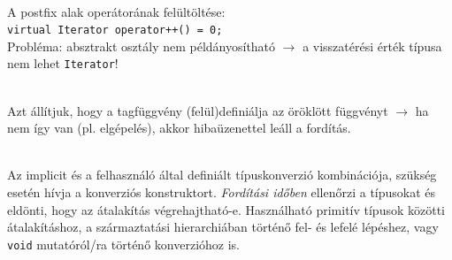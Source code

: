 \documentclass[usenames,dvipsnames,aspectratio=169]{beamer}
\begin{document}
\begin{frame}
    \begin{exampleblock}{}
        
    \end{exampleblock}
\end{frame}

\begin{frame}
    \begin{description}[m]
        \item[\texttt{operator++}] \hfill \\ A postfix alak operátorának felültöltése:\\ \texttt{virtual Iterator operator++() = 0;} \\
            Probléma: absztrakt osztály nem példányosítható $\to$ a visszatérési érték típusa nem lehet \texttt{Iterator}! 
    \end{description}
\end{frame}

\begin{frame}
    \begin{exampleblock}{}
        
    \end{exampleblock}
\end{frame}

\begin{frame}
    \begin{exampleblock}{}
        \small
        
    \end{exampleblock}
\end{frame}

\begin{frame}
    \begin{description}[m]
        \item[\hiv{\href{https://en.cppreference.com/w/cpp/language/override}{\texttt{override}}}] \hfill \\ Azt állítjuk, hogy a tagfüggvény (felül)definiálja az öröklött függvényt $\to$ ha nem így van (pl. elgépelés), akkor hibaüzenettel leáll a fordítás.
        \item[\hiv{\href{https://en.cppreference.com/w/cpp/language/static_cast}{\texttt{static\_cast}}}] \hfill \\ Az implicit és a felhasználó által definiált típuskonverzió kombinációja, szükség esetén hívja a konverziós konstruktort. \emph{Fordítási időben} ellenőrzi a típusokat és eldönti, hogy az átalakítás végrehajtható-e. Használható primitív típusok közötti átalakításhoz, a származtatási hierarchiában történő fel- és lefelé lépéshez, vagy \texttt{void} mutatóról/ra történő konverzióhoz is.
    \end{description}
\end{frame}
\end{document}
